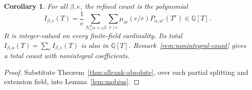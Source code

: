 \documentclass[11pt, reqno]{amsart}
\numberwithin{equation}{section}
\newtheorem{corollary}[theorem]{Corollary}
\theoremstyle{definition}
\theoremstyle{remark}
\newcommand{\mr}[1]{\mathrm{#1}}
\newcommand{\mb}[1]{\mathbb{#1}}
\newcommand{\mc}[1]{\mathcal{#1}}
\begin{document}
\begin{corollary}\label{cor:residue-traces}
For all $\beta,e$, the refined count is the polynomial
\begin{equation}\label{eq:residue-traces} I_{\beta,e}(T)=\frac1e \sum_{\mc N_e^a\alpha=\iota\beta} \sum_{r\mid e}\mu_{\mr{ar}}(e/r) P_{\alpha,a^r}(T^r)\in\mb Q[T].\end{equation}
It is integer-valued on every finite-field cardinality. Its total
$I_{\beta,a}(T)=\sum_e I_{\beta,e}(T)$ is also in $\mb Q[T]$.
Remark~\ref{rem:nonintegral-count} gives a total count with
nonintegral coefficients.
\end{corollary}
\begin{proof}
Substitute Theorem~\ref{thm:allrank-absolute}, over each partial
splitting and extension field, into Lemma~\ref{lem:mobius}.
\end{proof}
\end{document}
